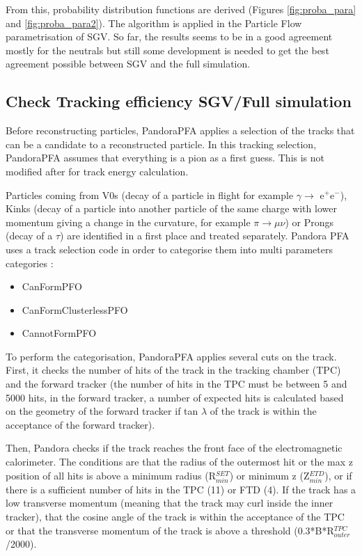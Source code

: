 \documentclass[a4paper,12pt]{article}
\begin{document}
\noindent
From this, probability distribution functions are derived (Figures \ref{fig:proba_para} and \ref{fig:proba_para2}). The algorithm is applied in the Particle Flow parametrisation of SGV. So far, the results seems to be in a good agreement mostly for the neutrals but still some development is needed to get the best agreement possible between SGV and the full simulation.

\subsection{Check Tracking efficiency SGV/Full simulation}
\label{sec:tracking}

Before reconstructing particles, PandoraPFA applies a selection of the tracks that can be a candidate to a reconstructed particle. In this tracking selection, 
PandoraPFA assumes that everything is a pion as a first guess. This is not modified after for track energy calculation. 

Particles coming from V0s (decay of a particle in flight for example $\gamma \rightarrow$ e$^+$e$^-$), Kinks (decay of a particle into another particle of the same charge with lower momentum giving a change in the curvature, for example $\pi \rightarrow \mu \nu$) or Prongs (decay of a $\tau$) are identified in a first place and treated separately.
Pandora PFA uses a track selection code in order to categorise them into multi parameters categories : 

\begin{itemize}
\item CanFormPFO
\item CanFormClusterlessPFO
\item CannotFormPFO
\end{itemize}

To perform the categorisation, PandoraPFA applies several cuts on the track. 
First, it checks the number of hits of the track in the tracking chamber (TPC) and the forward tracker (the number of hits in the TPC must be between 5 and 5000 hits, in the forward tracker, a number of expected hits is calculated based on the geometry of the forward tracker if tan $\lambda$ of the track is within the acceptance of the forward tracker). 

Then, Pandora checks if the track reaches the front face of the electromagnetic calorimeter. The conditions are that the radius of the outermost hit or the max z position of all hits is above a minimum radius (R$^{SET}_{min}$) or minimum z (Z$^{ETD}_{min}$), or if there is a sufficient number of hits in the TPC (11) or FTD (4). If the track has a low transverse momentum (meaning that the track may curl inside the inner tracker), that the cosine angle of the track is within the acceptance of the TPC or that the transverse momentum of the track is above a threshold (0.3*B*R$^{TPC}_{outer}$/2000).
\end{document}
